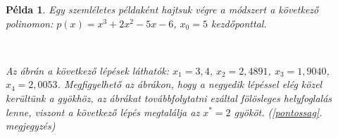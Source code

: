 \documentclass[a4paper,12pt]{report}
\newtheorem{Pl}[Tet]{Példa}
\begin{document}
            \begin{Pl}
				Egy szemléletes példaként hajtsuk végre a módszert a következő polinomon: $p(x)=x^3+2x^2-5x-6$, $x_0=5$ kezdőponttal.
				
				\begin{figure}[h]
					\centering
					\hspace{3mm} %
					\\
					\hspace{3mm} %
				\end{figure}
				
				Az ábrán a következő lépések láthatók: $x_1=3,\!4$, $x_2=2,\!4891$, $x_3=1,\!9040$, $x_4=2,\!0053$. Megfigyelhető az ábrákon, hogy a negyedik lépéssel elég közel kerültünk a gyökhöz, az ábrákat továbbfolytatni ezáltal fölösleges helyfoglalás lenne, viszont a következő lépés megtalálja az $x^*=2$ gyököt. (\ref{pontossag}. megjegyzés)
			\end{Pl}
\end{document}
